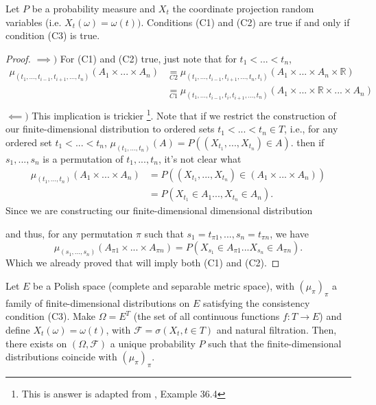 \begin{proposition}
	Let $P$ be a probability measure and $X_t$ the coordinate projection random variables
	(i.e. $X_t(\omega) = \omega(t))$.
	Conditions (C1) and (C2) are true if and only if condition (C3) is true.
\end{proposition}
\begin{proof}
	$\implies)$ For (C1) and (C2) true, just note that for $t_1<...<t_n$,
	\begin{align*}
		\mu_{(t_1,...,t_{i-1},t_{i+1},...,t_{n})}(A_1\times...\times A_n)
		 & \underset{C2}{=}
		\mu_{(t_1,...,t_{i-1},t_{i+1},...,t_n, t_{i})}(A_1\times...\times A_n \times \mathbb R)                             \\
		 & \underset{C1}{=} \mu_{(t_1,...,t_{i-1},t_i,t_{i+1},...,t_n)}(A_1\times...\times \mathbb R \times ... \times A_n) \\
	\end{align*}
	$\impliedby)$ This implication is trickier
	\footnote{This is answer is adapted from \citet{billingsley2008probability}, Example 36.4}.
	Note that if we restrict the construction
	of our finite-dimensional distribution to ordered sets $t_1< ... < t_n \in T$,
	i.e., for any ordered set $t_1<...<t_n$, $\mu_{(t_1,...,t_n)}(A) = P((X_{t_1},...,X_{t_n}) \in A)$.
	then if $s_1,...,s_n$ is a permutation of $t_1,...,t_n$, it's not clear what
	\begin{align*}
		\mu_{(t_1,...,t_n)}(A_1\times ... \times A_n)
		 & = P((X_{t_1}, ...,  X_{t_n})\in (A_1 \times...\times A_n)) \\
		 & = P(X_{t_1} \in A_1 ..., X_{t_n} \in A_n).
	\end{align*}
	Since we are constructing our finite-dimensional dimensional
	distribution


	and thus, for any permutation $\pi$ such that $s_1 = t_{\pi 1},..., s_n = t_{\pi n}$, we have
	\begin{displaymath}
		\mu_{(s_1,...,s_n)}(A_{\pi 1}\times ... \times A_{\pi n}) =
		P(X_{s_1} \in A_{\pi 1} ... X_{s_n} \in A_{\pi n}).
	\end{displaymath}
	Which we already proved that will imply both (C1) and (C2).

\end{proof}


\begin{theorem}
	Let $E$ be a Polish space (complete and separable metric space),
	with $(\mu_\pi)_\pi$ a family of
	finite-dimensional distributions on $E$ satisfying the consistency condition (C3).
	Make $\Omega = E^T$ (the set of all continuous functions $f:T \to E$)
	and define $X_t(\omega) = \omega(t)$, with $\mathcal F = \sigma (X_t, t \in T)$
	and natural filtration. Then, there exists on $(\Omega, \mathcal F)$ a unique
	probability $P$ such that the finite-dimensional distributions
	coincide with $(\mu_\pi)_\pi$.

\end{theorem}

